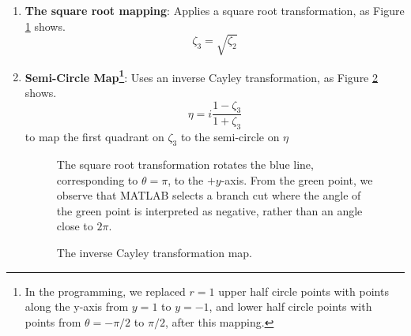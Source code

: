 \begin{enumerate}
    \item \textbf{The square root mapping}: Applies a square root transformation, as Figure \ref{fig:sqrt} shows.
    \[
    \zeta_3 = \sqrt{\zeta_2}
    \]
    \item \textbf{Semi-Circle Map\footnote{In the programming, we replaced \(r=1\) upper half circle points with points along the y-axis from \(y=1\) to \(y=-1\), and lower half circle points with points from \(\theta = -\pi/2\) to \(\pi/2\), after this mapping.}}: Uses an inverse Cayley transformation, as Figure \ref{fig:semi-circle} shows.
    \[
    \eta = i \frac{1 - \zeta_3}{1 + \zeta_3}
    \]
    to map the first quadrant on $\zeta_3$ to the semi-circle on $\eta$
    \begin{figure}[H]
        \centering
        \caption{\small The square root transformation rotates the blue line, corresponding to $\theta=\pi$, to the $+y$-axis. From the green point, we observe that MATLAB selects a branch cut where the angle of the green point is interpreted as negative, rather than an angle close to $2\pi$.}
        \label{fig:sqrt}
    \end{figure}
    \begin{figure}[H]
        \centering    
        \caption{The inverse Cayley transformation map.}
        \label{fig:semi-circle}
    \end{figure}


\end{enumerate}
